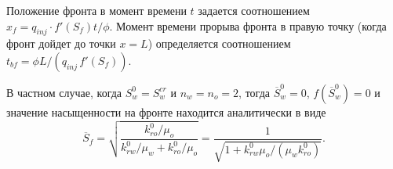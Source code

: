Положение фронта в момент времени $t$ задается соотношением $x_f=q_{inj}\cdot f'(S_f)t /\phi$. Момент времени прорыва фронта в правую точку (когда фронт дойдет до точки $x=L$) определяется соотношением
$  t_{bf}=\phi L / (q_{inj} \,f'(S_f)).$


В частном случае, когда $S_w^0=S_w^{cr}$ и $n_w=n_o=2$, тогда $\overline{S}_w^0=0$, $f(\overline{S}_w^0)=0$ и
значение насыщенности на фронте находится аналитически в виде
\begin{equation}\label{eq:star:exact_sw}
  \overline{S}_f=\sqrt{\frac{k_{ro}^0/\mu_o}{k_{rw}^0/\mu_w+k_{ro}^0/\mu_o}}=\frac{1}{\sqrt{1+k_{rw}^0 \mu_o/ (\mu_w k_{ro}^0)}}.
\end{equation}




